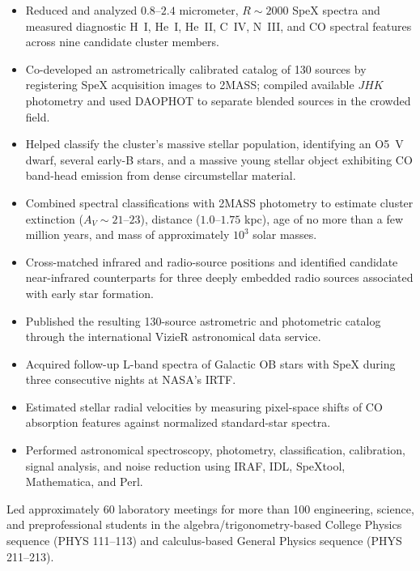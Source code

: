 \begin{itemize}
  \item Reduced and analyzed $0.8$--$2.4$ micrometer, $R \sim 2000$ SpeX spectra and measured diagnostic H~I, He~I, He~II, C~IV, N~III, and CO spectral features across nine candidate cluster members.
  \item Co-developed an astrometrically calibrated catalog of 130 sources by registering SpeX acquisition images to 2MASS; compiled available $JHK$ photometry and used DAOPHOT to separate blended sources in the crowded field.
  \item Helped classify the cluster's massive stellar population, identifying an O5~V dwarf, several early-B stars, and a massive young stellar object exhibiting CO band-head emission from dense circumstellar material.
  \item Combined spectral classifications with 2MASS photometry to estimate cluster extinction ($A_V \sim 21$--$23$), distance ($1.0$--$1.75$ kpc), age of no more than a few million years, and mass of approximately $10^3$ solar masses.
  \item Cross-matched infrared and radio-source positions and identified candidate near-infrared counterparts for three deeply embedded radio sources associated with early star formation.
  \item Published the resulting 130-source astrometric and photometric catalog through the international VizieR astronomical data service.
  \item Acquired follow-up L-band spectra of Galactic OB stars with SpeX during three consecutive nights at NASA's IRTF.
  \item Estimated stellar radial velocities by measuring pixel-space shifts of CO absorption features against normalized standard-star spectra.
  \item Performed astronomical spectroscopy, photometry, classification, calibration, signal analysis, and noise reduction using IRAF, IDL, SpeXtool, Mathematica, and Perl.
\end{itemize}
\begin{minipage}{\linewidth}
Led approximately 60 laboratory meetings for more than 100 engineering, science, and preprofessional students in the algebra/trigonometry-based College Physics sequence (PHYS 111--113) and calculus-based General Physics sequence (PHYS 211--213).
\end{minipage}
